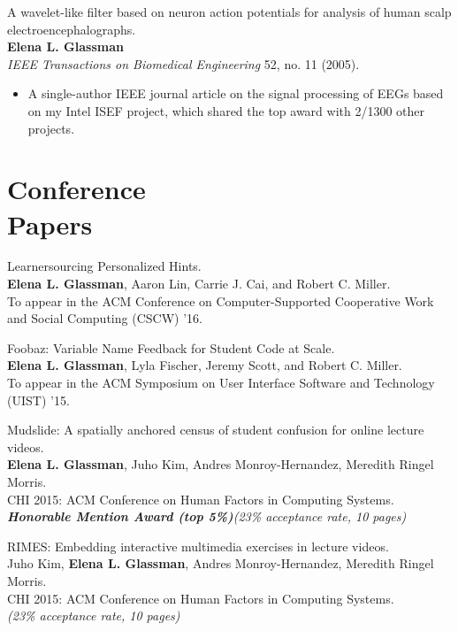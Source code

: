 \documentclass[margin]{res}
\begin{document}
\begin{resume}

A wavelet-like filter based on neuron action potentials for analysis of human scalp electroencephalographs.\\ 
{\bf Elena L. Glassman}\\
\textit{IEEE Transactions on Biomedical Engineering} 52, no. 11 (2005).
\begin{itemize} \itemsep -2pt  %
\item A single-author IEEE journal article on the signal processing of EEGs based on my Intel ISEF project, which shared the top award with 2/1300 other projects. 
\end{itemize}

\section{Conference\\ Papers}

Learnersourcing Personalized Hints.\\
{\bf Elena L. Glassman}, Aaron Lin, Carrie J. Cai, and Robert C. Miller.\\
To appear in the ACM Conference on Computer-Supported Cooperative Work and Social Computing (CSCW) '16.

Foobaz: Variable Name Feedback for Student Code at Scale.\\
{\bf Elena L. Glassman}, Lyla Fischer, Jeremy Scott, and Robert C. Miller.\\ 
To appear in the ACM Symposium on User Interface Software and Technology (UIST) '15.

Mudslide: A spatially anchored census of student confusion for online lecture videos.\\
{\bf Elena L. Glassman}, Juho Kim, Andres Monroy-Hernandez, Meredith Ringel Morris.\\
CHI 2015: ACM Conference on Human Factors in Computing Systems.\\
\textbf{\emph{Honorable Mention Award (top 5\%)}}{\it (23\% acceptance rate, 10 pages)}

RIMES: Embedding interactive multimedia exercises in lecture videos.\\
Juho Kim, {\bf Elena L. Glassman}, Andres Monroy-Hernandez, Meredith Ringel Morris. \\
CHI 2015: ACM Conference on Human Factors in Computing Systems.\\
{\it (23\% acceptance rate, 10 pages)}


\end{resume}
\end{document}
